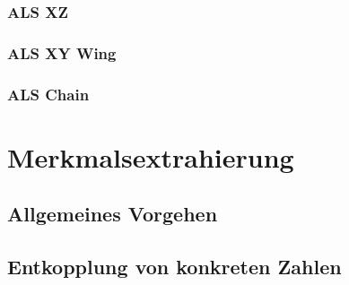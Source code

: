 \documentclass[accentcolor=tud6b,11pt,paper=a4]{tudreport}
\begin{document}
\subsection{ALS XZ}
\subsection{ALS XY Wing}
\subsection{ALS Chain}


\chapter{Merkmalsextrahierung}
\section{Allgemeines Vorgehen}
\section{Entkopplung von konkreten Zahlen}
\end{document}

